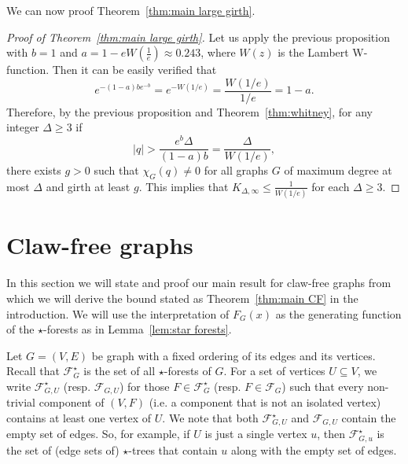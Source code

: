 \documentclass[a4paper,11pt,reqno]{amsart}
\numberwithin{equation}{section}
\begin{document}
We can now proof Theorem~\ref{thm:main large girth}.
\begin{proof}[Proof of Theorem~\ref{thm:main large girth}]
Let us apply the previous proposition with $b=1$ and $a=1-e W(\tfrac{1}{e})\approx 0.243$, where $W(z)$ is the Lambert W-function. Then it can be easily verified that
\[
    e^{-(1-a)be^{-b}}=e^{-W(1/e)}=\frac{W(1/e)}{1/e}=1-a.
\]
Therefore, by the previous proposition and Theorem~\ref{thm:whitney}, for any integer $\Delta\geq 3$ if
\[
    |q|>\frac{e^b\Delta}{(1-a)b}=\frac{\Delta}{W(1/e)},%
\]
there exists $g>0$ such that $\chi_G(q)\neq 0$ for all graphs $G$ of maximum degree at most $\Delta$ and girth at least $g$. %
This implies that %
$K_{\Delta,\infty}\leq \tfrac{1}{W(1/e)}$ for each $\Delta\geq 3$.
\end{proof}

\section{Claw-free graphs}\label{sec:claw-free}
In this section we will state and proof our main result for claw-free graphs from which we will derive the bound stated as Theorem~\ref{thm:main CF} in the introduction.
We will use the interpretation of $F_G(x)$ as the generating function of the $\star$-forests as in Lemma~\ref{lem:star forests}.

Let $G=(V,E)$ be graph with a fixed ordering of its edges and its vertices.
Recall that $\mathcal{F}^\star_G$ is the set of all $\star$-forests of $G$.
For a set of vertices $U \subseteq V$, we write $\mathcal{F}^\star_{G,U}$ (resp. $\mathcal{F}_{G,U}$) for those $F \in \mathcal{F}^\star_G$ (resp. $F \in \mathcal{F}_G$) such that every non-trivial component of $(V,F)$ (i.e. a component that is not an isolated vertex) contains at least one vertex of $U$. 
We note that both $\mathcal{F}^\star_{G,U}$ and $\mathcal{F}_{G,U}$ contain the empty set of edges. 
So, for example, if $U$ is just a single vertex $u$, then $\mathcal{F}^\star_{G,u}$ is the set of (edge sets of) $\star$-trees that contain $u$ along with the empty set of edges. 
\end{document}
